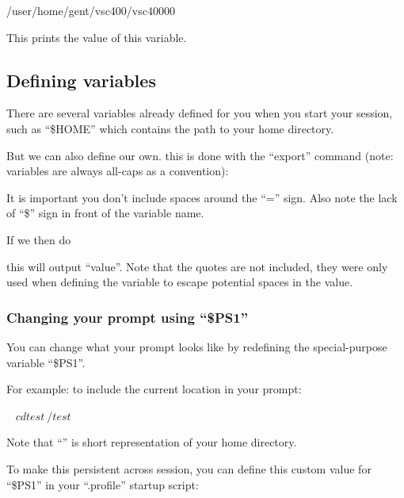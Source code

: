 \begin{prompt}
/user/home/gent/vsc400/vsc40000
\end{prompt}

This prints the value of this variable.

\subsection{Defining variables}

There are several variables already defined for you when you start your
session, such as ``\$HOME'' which contains the path to your home directory. 

But we can also define our own. this is done with the ``export'' command (note:
variables are always all-caps as a convention):

\begin{prompt} 
\end{prompt}

It is important you don't include spaces around the ``='' sign. Also note
the lack of ``\$'' sign in front of the variable name.

If we then do

\begin{prompt}
\end{prompt}

this will output ``value''. Note that the quotes are not included, they were
only used when defining the variable to escape potential spaces in the value.

\subsubsection{Changing your prompt using ``\$PS1''}

You can change what your prompt looks like by redefining the special-purpose
variable ``\$PS1''.

For example: to include the current location in your prompt:

\begin{prompt}
~ $ cd test
~/test $
\end{prompt}

Note that ``\tilde'' is short representation of your home directory.

To make this persistent across session, you can define this custom value for
``\$PS1'' in your ``.profile'' startup script:

